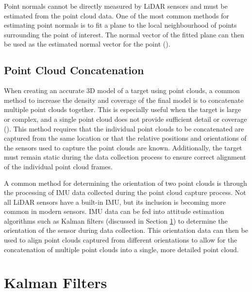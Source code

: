 Point normals cannot be directly measured by \ac{LiDAR} sensors and must be estimated from the point cloud data. One of the most common methods for estimating point normals is to fit a plane to the local neighbourhood of points surrounding the point of interest. The normal vector of the fitted plane can then be used as the estimated normal vector for the point (\cite{bogoslavskyiFastRobustNormal2024}).

\subsection{Point Cloud Concatenation}

When creating an accurate 3D model of a target using point clouds, a common method to increase the density and coverage of the final model is to concatenate multiple point clouds together. This is especially useful when the target is large or complex, and a single point cloud does not provide sufficient detail or coverage (\cite{kedzierskiMethodsLaserScanning2015}). This method requires that the individual point clouds to be concatenated are captured from the same location or that the relative positions and orientations of the sensors used to capture the point clouds are known. Additionally, the target must remain static during the data collection process to ensure correct alignment of the individual point cloud frames.

A common method for determining the orientation of two point clouds is through the processing of \ac{IMU} data collected during the point cloud capture process. Not all \ac{LiDAR} sensors have a built-in \ac{IMU}, but its inclusion is becoming more common in modern sensors. \ac{IMU} data can be fed into attitude estimation algorithms such as Kalman filters (discussed in Section \ref{sec:ch3:section4}) to determine the orientation of the sensor during data collection. This orientation data can then be used to align point clouds captured from different orientations to allow for the concatenation of multiple point clouds into a single, more detailed point cloud.
 
\section{Kalman Filters}
\label{sec:ch3:section4}

